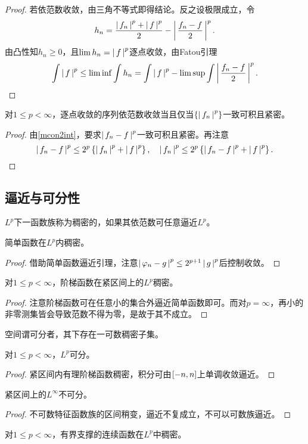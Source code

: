 \documentclass{ctexrep}
\begin{document}
  \begin{proof}
    若依范数收敛，由三角不等式即得结论。反之设极限成立，令
    \[ h_n = \frac{\left|\, f_n \,\right|^p+\left|\, f \,\right|^p}{2}-\left|\, \frac{f_n-f}{2} \,\right|^p. \]
    由凸性知$h_n\ge 0$，且$\lim h_n = \left|\, f \,\right|^p$逐点收敛，由Fatou引理
    \[ \int \left|\, f \,\right|^p \le \lim \inf \int h_n = \int \left|\, f \,\right|^p - \lim\sup\int\left|\, \frac{f_n-f}{2} \,\right|^p. \qedhere \]
  \end{proof}
  \begin{theorem}
    对$1\le p<\infty$，逐点收敛的序列依范数收敛当且仅当$\left\{\left|\, f_n \,\right|^p\right\}$一致可积且紧密。
  \end{theorem}
  \begin{proof}
    由\cref{mcon2int}，要求$\left|\, f_n-f \,\right|^p$一致可积且紧密。再注意
    \[ \left|\, f_n-f \,\right|^p \le 2^p\left\{\left|\, f_n \,\right|^p+\left|\, f \,\right|^p\right\}, \quad \left|\, f_n \,\right|^p \le 2^p\left\{\left|\, f_n-f \,\right|^p+\left|\, f \,\right|^p\right\}. \qedhere \]
  \end{proof}
  \subsection{逼近与可分性}
  \begin{definition}
    $L^p$下一函数族称为稠密的，如果其依范数可任意逼近$L^p$。
  \end{definition}
  \begin{proposition}
    简单函数在$L^p$内稠密。
  \end{proposition}
  \begin{proof}
    借助简单函数逼近引理，注意$\left|\, \varphi_n-g \,\right|^p \le 2^{p+1}\left|\, g \,\right|^p$后控制收敛。
  \end{proof}
  \begin{proposition}
    对$1\le p<\infty$，阶梯函数在紧区间上的$L^p$稠密。
  \end{proposition}
  \begin{proof}
    注意阶梯函数可在任意小的集合外逼近简单函数即可。而对$p=\infty$，再小的非零测集皆会导致范数不得为零，是故于其不成立。
  \end{proof}
  \begin{definition}
    空间谓可分者，其下存在一可数稠密子集。
  \end{definition}
  \begin{theorem}
    对$1\le p < \infty$，$L^p$可分。
  \end{theorem}
  \begin{proof}
    紧区间内有理阶梯函数稠密，积分可由$\left[-n,n\right]$上单调收敛逼近。
  \end{proof}
  \begin{ex}
    紧区间上的$L^\infty$不可分。
  \end{ex}
  \begin{proof}
    不可数特征函数族的区间稍变，逼近不复成立，不可以可数族逼近。
  \end{proof}
  \begin{theorem}
    对$1\le p<\infty$，有界支撑的连续函数在$L^p$中稠密。
  \end{theorem}
\end{document}
